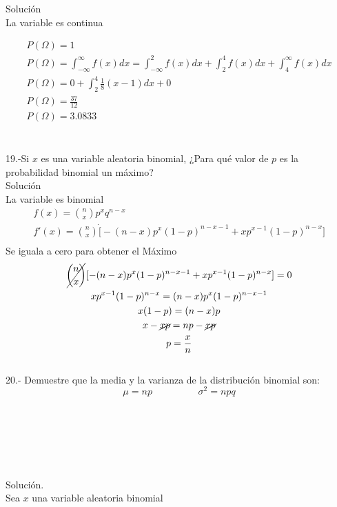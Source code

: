 \documentclass{article}
\begin{document}
Solución\\
La variable es continua\\
\begin{center}
\begin{gather*}
	P(\Omega) = 1\\
	P(\Omega) = \int_{-\infty}^{\infty} f(x)dx = \int_{-\infty}^{2} f(x)dx + \int_{2}^{4} f(x)dx + \int_{4}^{\infty} f(x)dx\\
	P(\Omega) = 0 + \int_{2}^{4}\frac{1}{8}(x - 1) dx + 0\\
	P(\Omega) = \frac{37}{12}\\
	P(\Omega) = 3.0833\\
\end{gather*}\\
\end{center}
19.-Si $x$ es una variable aleatoria binomial, ¿Para qué valor de $p$ es la probabilidad binomial un máximo?\\
Solución\\
La variable es binomial\\
\begin{gather*}
	f(x) = {n \choose x}p^xq^{n-x}\\
	f'(x) =  {n \choose x}\dot[-(n-x)p^x(1-p)^{n-x-1} + xp^{x-1}(1 - p)^{n-x}]\\
\end{gather*}
Se iguala a cero para obtener el Máximo
\begin{gather*}
	\displaystyle\cancel{{n \choose x}}[-(n-x)p^x(1 - p)^{n-x-1} + xp^{x-1}(1 - p)^{n-x}] = 0\\
	xp^{x-1}(1 - p)^{n-x} = (n-x)p^x(1 - p)^{n-x-1}\\
	x(1 - p) = (n - x)p\\
	x - \cancel{xp} = np - \cancel{xp}\\
	p = \frac{x}{n}
\end{gather*}\\
20.- Demuestre que la media y la varianza de la distribución binomial son:\\
	$$ \mu = np\hspace{2cm} \sigma^2 = npq$$\\\\\\\\\\\\
Solución.\\
Sea $x$ una variable aleatoria binomial\\
\end{document}
